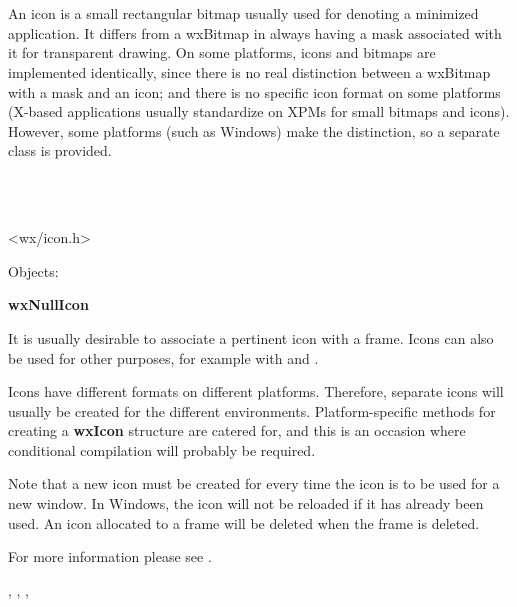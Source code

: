 \section{}\label{wxicon}

An icon is a small rectangular bitmap usually used for denoting a
minimized application. It differs from a wxBitmap in always
having a mask associated with it for transparent drawing. On some platforms,
icons and bitmaps are implemented identically, since there is no real distinction between
a wxBitmap with a mask and an icon; and there is no specific icon format on
some platforms (X-based applications usually standardize on XPMs for small bitmaps
and icons). However, some platforms (such as Windows) make the distinction, so
a separate class is provided.


\\
\\


<wx/icon.h>


Objects:

{\bf wxNullIcon}


It is usually desirable to associate a pertinent icon with a frame. Icons
can also be used for other purposes, for example with  
and .

Icons have different formats on different platforms.
Therefore, separate icons will usually be created for the different
environments.  Platform-specific methods for creating a {\bf wxIcon}\rtfsp
structure are catered for, and this is an occasion where conditional
compilation will probably be required.

Note that a new icon must be created for every time the icon is to be
used for a new window. In Windows, the icon will not be
reloaded if it has already been used. An icon allocated to a frame will
be deleted when the frame is deleted.

For more information please see .


, , 
, 

